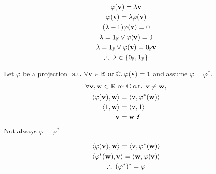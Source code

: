 \documentclass{mathtoolkit}
\begin{document}
\begin{p}
  \item
    \begin{subp}
      \item
        \begin{gather*}
          \varphi(\vec{v}) = \lambda \vec{v} \\
          \varphi(\vec{v}) = \lambda \varphi(\vec{v}) \\
          (\lambda - 1) \varphi(\vec{v}) = 0 \\
          \lambda = 1_\field{F} \vee \varphi(\vec{v}) = 0 \\
          \lambda = 1_\field{F} \vee \varphi(\vec{v}) = 0_\field{F} \vec{v} \\
          \therefore \lambda \in \left\{ 0_\field{F}, 1_\field{F} \right\}
        \end{gather*}

      \item
        Let $\varphi$ be a projection
        $\st \forall \vec{v} \in \field{R} \text{or} \field{C}, \varphi(\vec{v}) = 1$
        and assume $\varphi = \varphi^*$.
        \begin{gather*}
          \forall \vec{v}, \vec{w} \in \field{R} \text{or} \field{C} \st \vec{v} \ne \vec{w}, \\
          \begin{aligned}
            \ip{\varphi(\vec{v})}{\vec{w}} & = \ip{\vec{v}}{\varphi^*(\vec{w})} \\
            \ip{1}{\vec{w}} & = \ip{\vec{v}}{1} \\
            \vec{v} & = \vec{w} \contradiction
          \end{aligned}
        \end{gather*}
        \therefore Not always $\varphi = \varphi^*$
    \end{subp}

  \item
    \begin{subp}
      \item
        \begin{gather*}
          \ip{\varphi(\vec{v})}{\vec{w}} = \ip{\vec{v}}{\varphi^*(\vec{w})} \\
          \ip{\varphi^*(\vec{w})}{\vec{v}} = \ip{\vec{w}}{\varphi(\vec{v})} \\
          \therefore (\varphi^*)^* = \varphi
        \end{gather*}


\end{subp}
\end{p}
\end{document}
